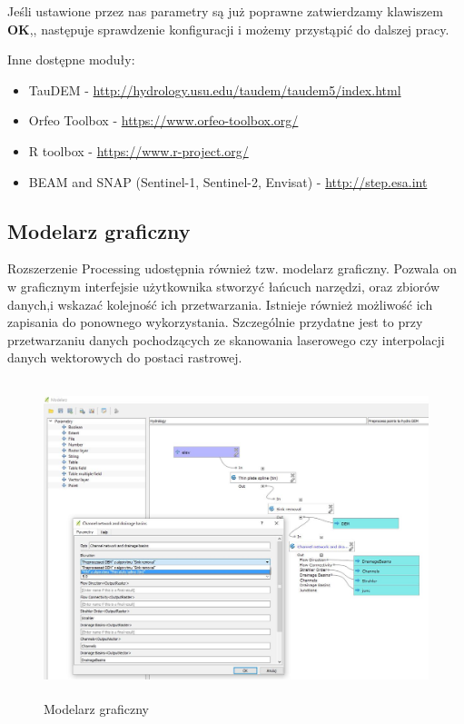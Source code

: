 \documentclass[12pt,a4paper]{book}
\begin{document}
Jeśli ustawione przez nas parametry są już poprawne zatwierdzamy klawiszem \textbf{OK},, następuje sprawdzenie konfiguracji i możemy przystąpić do dalszej pracy.

Inne dostępne moduły:

\begin{itemize}
\item TauDEM - \url{http://hydrology.usu.edu/taudem/taudem5/index.html}
\item Orfeo Toolbox - \url{https://www.orfeo-toolbox.org/}
\item R toolbox - \url{https://www.r-project.org/}
\item BEAM and SNAP (Sentinel-1, Sentinel-2, Envisat) - \url{http://step.esa.int}
\end{itemize}
\subsection{Modelarz graficzny}
Rozszerzenie Processing udostępnia również tzw. modelarz graficzny. Pozwala on w graficznym interfejsie użytkownika stworzyć łańcuch narzędzi, oraz zbiorów danych,i wskazać kolejność ich przetwarzania. Istnieje również możliwość ich zapisania do ponownego wykorzystania. Szczególnie przydatne jest to przy przetwarzaniu danych pochodzących ze skanowania laserowego czy interpolacji danych wektorowych do postaci rastrowej.



\begin{center}
\begin{figure}
\includegraphics[width=12.562cm,height=9.229cm]{002-modelarz.jpg}
\caption{Modelarz graficzny}
\end{figure}
\end{center}
\end{document}
